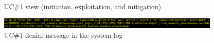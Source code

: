 \begin{figure}[h!]
  \caption{\label{fig:seapp_uc1_views} UC\#1 view (initiation, exploitation, and mitigation)}
\end{figure}

\begin{figure}[h!]
  \centering
  \includegraphics[width=\textwidth]{chapters/seapp/figs/ae/UseCase1Logcat.png}
  \caption{\label{fig:seapp_uc1_logcat} UC\#1 \sel denial message in the system log} 
\end{figure}

\newpage
      

